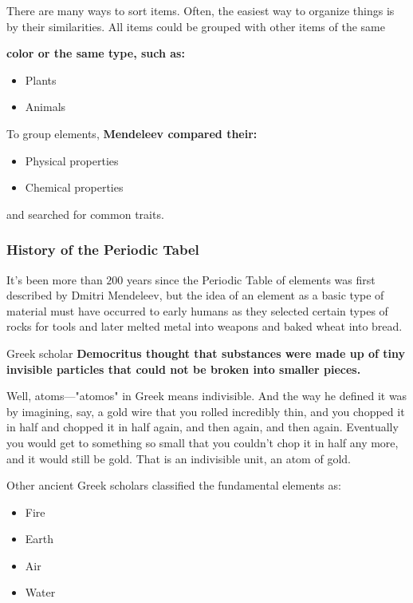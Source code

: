 
There are many ways to sort items. Often, the easiest way to organize things is
by their similarities. All items could be grouped with other items of the same

\bf{color} or \bf{the same type}, such as:

\begin{itemize}
    \item Plants
    \item Animals
\end{itemize}

To group elements, \bf{Mendeleev} compared their:

\begin{itemize}
    \item Physical properties 
    \item Chemical properties 
\end{itemize}

and searched for common traits.

\subsubsection*{History of the Periodic Tabel}

It's been more than $200$ years since the Periodic Table of elements was first
described by Dmitri Mendeleev, but the idea of an element as a basic type of
material must have occurred to early humans as they selected certain types of
rocks for tools and later melted metal into weapons and baked wheat into bread.

Greek scholar \bf{Democritus} thought that substances were made up of tiny invisible
particles that could not be broken into smaller pieces.

Well, atoms—"atomos" in Greek means indivisible. And the way he defined it was
by imagining, say, a gold wire that you rolled incredibly thin, and you chopped
it in half and chopped it in half again, and then again, and then again.
Eventually you would get to something so small that you couldn't chop it in half
any more, and it would still be gold. That is an indivisible unit, an atom of
gold.

Other ancient Greek scholars classified the fundamental elements as:

\begin{itemize}
    \item Fire
    \item Earth
    \item Air
    \item Water
\end{itemize}

